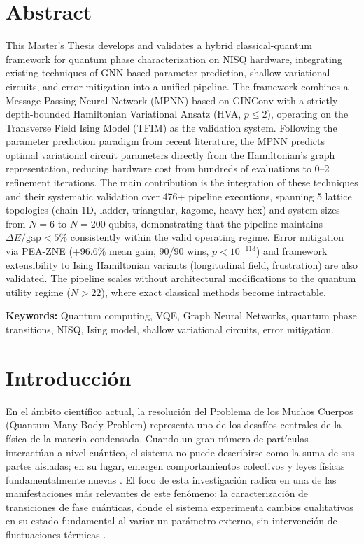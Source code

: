 \documentclass[11pt,a4paper,spanish]{book}
\begin{document}
\chapter{Abstract}

This Master's Thesis develops and validates a hybrid classical-quantum framework for quantum phase characterization on NISQ hardware, integrating existing techniques of GNN-based parameter prediction, shallow variational circuits, and error mitigation into a unified pipeline. The framework combines a Message-Passing Neural Network (MPNN) based on GINConv with a strictly depth-bounded Hamiltonian Variational Ansatz (HVA, $p \leq 2$), operating on the Transverse Field Ising Model (TFIM) as the validation system. Following the parameter prediction paradigm from recent literature, the MPNN predicts optimal variational circuit parameters directly from the Hamiltonian's graph representation, reducing hardware cost from hundreds of evaluations to 0--2 refinement iterations. The main contribution is the integration of these techniques and their systematic validation over 476+ pipeline executions, spanning 5 lattice topologies (chain 1D, ladder, triangular, kagome, heavy-hex) and system sizes from $N=6$ to $N=200$ qubits, demonstrating that the pipeline maintains $\Delta E/\text{gap} < 5\%$ consistently within the valid operating regime. Error mitigation via PEA-ZNE (+96.6\% mean gain, 90/90 wins, $p < 10^{-113}$) and framework extensibility to Ising Hamiltonian variants (longitudinal field, frustration) are also validated. The pipeline scales without architectural modifications to the quantum utility regime ($N > 22$), where exact classical methods become intractable.

\vspace{0.5cm}
{\bf Keywords:} Quantum computing, VQE, Graph Neural Networks, quantum phase transitions, NISQ, Ising model, shallow variational circuits, error mitigation.

\mainmatter


\chapter{Introducción}

En el ámbito científico actual, la resolución del Problema de los Muchos Cuerpos (Quantum Many-Body Problem) representa uno de los desafíos centrales de la física de la materia condensada. Cuando un gran número de partículas interactúan a nivel cuántico, el sistema no puede describirse como la suma de sus partes aisladas; en su lugar, emergen comportamientos colectivos y leyes físicas fundamentalmente nuevas \citep{anderson1972}. El foco de esta investigación radica en una de las manifestaciones más relevantes de este fenómeno: la caracterización de transiciones de fase cuánticas, donde el sistema experimenta cambios cualitativos en su estado fundamental al variar un parámetro externo, sin intervención de fluctuaciones térmicas \citep{dutta2015}.
\end{document}
